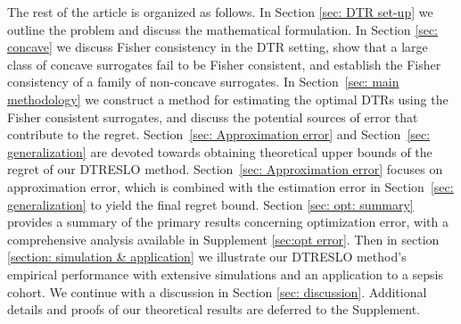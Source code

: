 \documentclass[preprint] {imsart}
\begin{document}

The rest of the article is organized as follows. In Section \ref{sec: DTR set-up} we outline the problem and discuss the mathematical formulation. In Section \ref{sec: concave} we discuss Fisher consistency in the DTR setting,  show that a large class of concave surrogates fail to be Fisher consistent, and  establish the Fisher consistency of a family of non-concave surrogates. In Section~\ref{sec: main methodology} we construct a method for estimating the optimal DTRs using the Fisher consistent surrogates, and discuss  the potential sources of error that contribute to the regret.  Section~\ref{sec: Approximation error} and Section~\ref{sec: generalization} are devoted towards obtaining theoretical upper bounds of the regret of our DTRESLO method.  Section~\ref{sec: Approximation error} focuses on approximation error, which is combined with the estimation error in Section~\ref{sec: generalization} to yield  the final regret bound. Section \ref{sec: opt: summary} provides a summary of the primary results concerning optimization error, with a comprehensive analysis available in Supplement \ref{sec:opt error}.
Then in section \ref{section: simulation & application} we illustrate our DTRESLO method's empirical performance with extensive simulations and an application to a sepsis cohort. We continue with a discussion in Section \ref{sec: discussion}. Additional details and proofs of our theoretical results are deferred to the Supplement.
\end{document}
